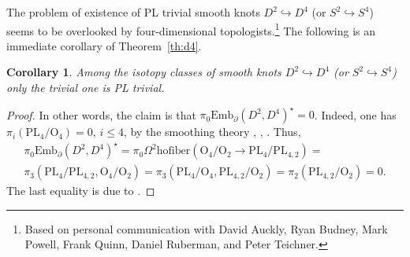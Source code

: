 \documentclass[11pt]{amsart}
\newtheorem{corollary}[theorem]{Corollary}
\theoremstyle{definition}
\newcommand{\Emb}{\mathrm{Emb}}
\newcommand{\PL}{\mathrm{PL}}
\newcommand{\OO}{\mathrm{O}}
\newcommand{\GG}{\mathrm{G}}
\newcommand{\hofiber}{\mathrm{hofiber}}
\numberwithin{equation}{section}
\begin{document}
The problem of existence of PL trivial smooth knots $D^2\hookrightarrow D^4$ (or $S^2\hookrightarrow S^4$) seems to be overlooked by four-dimensional topologists.\footnote{Based on personal communication with David Auckly, Ryan Budney, Mark Powell, Frank Quinn, Daniel Ruberman, and Peter Teichner.} The following is an immediate corollary of Theorem~\ref{th:d4}. 

\begin{corollary}\label{cor:d2_d4}
 Among the isotopy classes of smooth knots $D^2\hookrightarrow D^4$ (or $S^2\hookrightarrow S^4$) only the trivial one is PL trivial.
\end{corollary}

\begin{proof}
In other words, the claim is that $\pi_0\Emb_\partial(D^2,D^4)^\star=0$. %
 Indeed, one has $\pi_i(\PL_4/\OO_4)=0$, $i\leq 4$,
by the smoothing theory \cite[Essay~II]{KS_essays}, \cite{HirschMazur}, \cite[Theorem~8.3C]{FQ}. %
 Thus,
\begin{multline*}
\pi_0\Emb_\partial(D^2,D^4)^\star=\pi_0\Omega^2\hofiber\left(\OO_4/\OO_2\to \PL_4/\PL_{4,2}\right)=
\\
\pi_3\left(\PL_4/\PL_{4,2},\OO_4/\OO_2\right)=\pi_3\left(\PL_4/\OO_4,\PL_{4,2}/\OO_2
\right)=\pi_2(\PL_{4,2}/\OO_2)=0. %
\end{multline*}
The last equality is due to \cite[Lemma 5]{Wall_codim2}. %
\end{proof}

%
\end{document}

